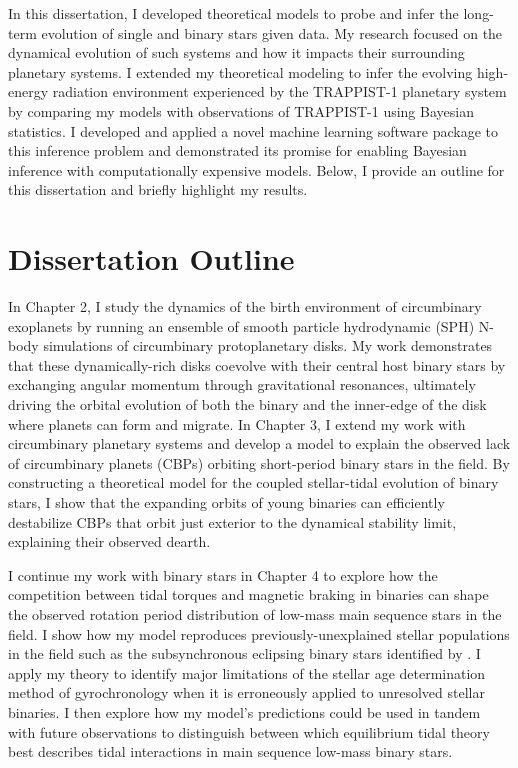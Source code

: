 In this dissertation, I developed theoretical models to probe and infer the long-term evolution of single and binary stars given data. My research focused on the dynamical evolution of such systems and how it impacts their surrounding planetary systems. I extended my theoretical modeling to infer the evolving high-energy radiation environment experienced by the TRAPPIST-1 planetary system by comparing my models with observations of TRAPPIST-1 using Bayesian statistics. I developed and applied a novel machine learning software package to this inference problem and demonstrated its promise for enabling Bayesian inference with computationally expensive models. Below, I provide an outline for this dissertation and briefly highlight my results. 

\section{Dissertation Outline}

In Chapter 2, I study the dynamics of the birth environment of circumbinary exoplanets by running an ensemble of smooth particle hydrodynamic (SPH) N-body simulations of circumbinary protoplanetary disks. My work demonstrates that these dynamically-rich disks coevolve with their central host binary stars by exchanging angular momentum through gravitational resonances, ultimately driving the orbital evolution of both the binary and the inner-edge of the disk where planets can form and migrate. In Chapter 3, I extend my work with circumbinary planetary systems and develop a model to explain the observed lack of circumbinary planets (CBPs) orbiting short-period binary stars in the \kepler field. By constructing a theoretical model for the coupled stellar-tidal evolution of binary stars, I show that the expanding orbits of young binaries can efficiently destabilize CBPs that orbit just exterior to the dynamical stability limit, explaining their observed dearth.

I continue my work with binary stars in Chapter 4 to explore how the competition between tidal torques and magnetic braking in binaries can shape the observed rotation period distribution of low-mass main sequence stars in the \kepler field. I show how my model reproduces previously-unexplained stellar populations in the \kepler field such as the subsynchronous eclipsing binary stars identified by \citet{Lurie2017}. I apply my theory to identify major limitations of the stellar age determination method of gyrochronology when it is erroneously applied to unresolved stellar binaries. I then explore how my model's predictions could be used in tandem with future observations to distinguish between which equilibrium tidal theory best describes tidal interactions in main sequence low-mass binary stars.

